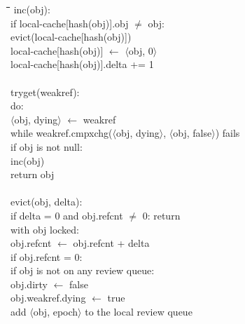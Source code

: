 \begin{figure}
  \def\fgap{-0.25em}            %
  \begin{tabbing}
    \quad\=\quad\=\quad\=\quad\=\quad\=\quad\=\kill
    inc(obj): \+\\
      if local-cache[hash(obj)].obj $\ne$ obj: \+\\
        evict(local-cache[hash(obj)]) \\
        local-cache[hash(obj)] $\gets$ $\langle$obj, 0$\rangle$ \-\\
      local-cache[hash(obj)].delta += 1 \\
    \-\\[\fgap]
    tryget(weakref): \+\\
      do: \+\\
        $\langle$obj, dying$\rangle$ $\gets$ weakref \-\\
      while weakref.cmpxchg($\langle$obj, dying$\rangle$,
        $\langle$obj, false$\rangle$) fails \\
      if obj is not null: \+\\
        inc(obj) \-\\
      return obj \\
    \-\\[\fgap]
    evict(obj, delta): \+\\
      if delta = 0 and obj.refcnt $\ne$ 0: return \\
      with obj locked: \+\\
        obj.refcnt $\gets$ obj.refcnt + delta \\
        if obj.refcnt = 0: \+\\
          if obj is not on any review queue: \+\\
            obj.dirty $\gets$ false \\
            obj.weakref.dying $\gets$ true \\
            add $\langle$obj, epoch$\rangle$ to the local review
            queue \-\\

\end{tabbing}
\end{figure}

